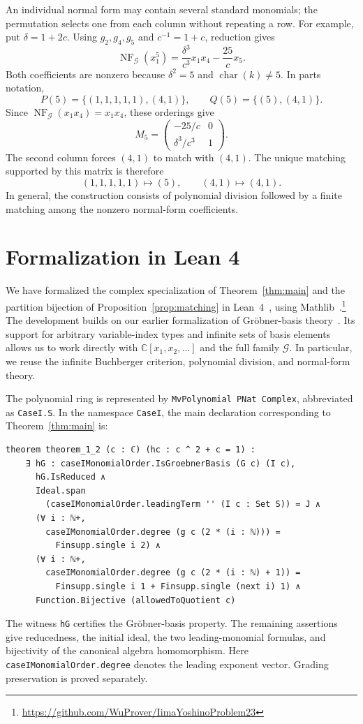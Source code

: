 \documentclass[11pt,reqno]{amsart}
\theoremstyle{definition}
\theoremstyle{remark}
\theoremstyle{plain}
\newcommand{\CC}{\mathbb C}
\newcommand{\NF}{\operatorname{NF}}
\begin{document}
An individual normal form may contain several standard monomials;
the permutation selects one from each column without repeating a
row.  For example, put \(\delta=1+2c\).  Using \(g_2,g_4,g_5\) and
\(c^{-1}=1+c\), reduction gives
\begin{equation}\label{eq:degree-five-normal-form}
 \NF_{\mathcal G}(x_1^5)
 =\frac{\delta^3}{c^3}x_1x_4-\frac{25}{c}x_5.
\end{equation}
Both coefficients are nonzero because \(\delta^2=5\) and
\(\operatorname{char}(k)\neq5\).  In parts notation,
$$
 P(5)=\{(1,1,1,1,1),(4,1)\},
 \qquad
 Q(5)=\{(5),(4,1)\}.
$$
Since \(\NF_{\mathcal G}(x_1x_4)=x_1x_4\), these orderings give
$$
 M_5=
 \begin{pmatrix}
  -25/c&0\\
  \delta^3/c^3&1
 \end{pmatrix}.
$$
The second column forces \((4,1)\) to match with \((4,1)\).
The unique matching supported by this matrix is therefore
$$
 (1,1,1,1,1)\longmapsto(5),
 \qquad
 (4,1)\longmapsto(4,1).
$$
In general, the construction consists of polynomial division followed
by a finite matching among the nonzero normal-form coefficients.

\section{Formalization in Lean 4}\label{sec:lean}

We have formalized the complex specialization of
Theorem~\ref{thm:main} and the partition bijection of
Proposition~\ref{prop:matching} in Lean~4~\cite{deMouraUllrich2021},
using Mathlib~\cite{Mathlib2020}.\footnote{\url{https://github.com/WuProver/IimaYoshinoProblem23}}
The development builds on our earlier formalization of
Gr\"obner-basis theory~\cite{GuoShenLiuZhi2026}.  Its support for
arbitrary variable-index types and infinite sets of basis elements
allows us to work directly with \(\CC[x_1,x_2,\ldots]\) and the full
family \(\mathcal G\).  In particular, we reuse the infinite
Buchberger criterion, polynomial division, and normal-form theory.

The polynomial ring is represented by
\texttt{MvPolynomial PNat Complex}, abbreviated as
\texttt{CaseI.S}.  In the namespace \texttt{CaseI}, the main
declaration corresponding to Theorem~\ref{thm:main} is:
\begin{lstlisting}
theorem theorem_1_2 (c : ℂ) (hc : c ^ 2 + c = 1) :
    ∃ hG : caseIMonomialOrder.IsGroebnerBasis (G c) (I c),
      hG.IsReduced ∧
      Ideal.span
        (caseIMonomialOrder.leadingTerm '' (I c : Set S)) = J ∧
      (∀ i : ℕ+,
        caseIMonomialOrder.degree (g c (2 * (i : ℕ))) =
          Finsupp.single i 2) ∧
      (∀ i : ℕ+,
        caseIMonomialOrder.degree (g c (2 * (i : ℕ) + 1)) =
          Finsupp.single i 1 + Finsupp.single (next i) 1) ∧
      Function.Bijective (allowedToQuotient c)
\end{lstlisting}
The witness \texttt{hG} certifies the Gr\"obner-basis property.
The remaining assertions give reducedness, the initial ideal,
the two leading-monomial formulas, and bijectivity of the canonical
algebra homomorphism.  Here
\texttt{caseIMonomialOrder.degree} denotes the leading exponent
vector.  Grading preservation is proved separately.
\end{document}
